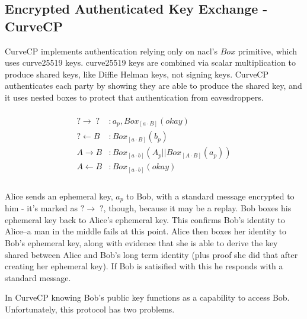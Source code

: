 \documentclass[12pt]{article}
\begin{document}
\subsection{Encrypted Authenticated Key Exchange - CurveCP}

CurveCP\cite{curvecp} implements authentication relying only on
nacl's\cite{nacl} $Box$ primitive, which uses curve25519 keys.
curve25519 keys are combined via scalar multiplication to produce
shared keys, like Diffie Helman keys\cite{ndic}, not signing keys.
CurveCP authenticates each party by showing they are able to produce
the shared key, and it uses nested boxes to protect that authentication
from eavesdroppers.

$$
\begin{align*}
\\
    ? \to \;?\;   &: a_p, Box_{[a\cdot B]}(okay) \\
    ? \gets B &: Box_{[a\cdot B]}(b_p) \\
    A \to B   &: Box_{[a\cdot b]}(A_p||Box_{[A \cdot B]}(a_p))\\
    A \gets B &: Box_{[a\cdot b]}(okay) \\
\\
\end{align*}
$$

Alice sends an ephemeral key, $a_p$ to Bob, with a standard message
encrypted to him - it's marked as $? \to \;?$, though, because it may
be a replay. Bob boxes his ephemeral key back to Alice's ephemeral
key. This confirms Bob's identity to Alice--a man in the middle fails
at this point. Alice then boxes her identity to Bob's ephemeral key,
along with evidence that she is able to derive the key shared between
Alice and Bob's long term identity (plus proof she did that after creating
her ephemeral key). If Bob is satisified with this he responds with
a standard message.

In CurveCP knowing Bob's public key functions as a capability
to access Bob. Unfortunately, this protocol has two problems.
\end{document}
